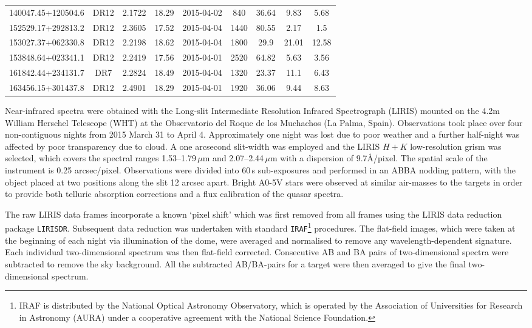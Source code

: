 \begin{table}
\begin{minipage}{16cm}
\begin{tabular}{ccccccccc}
	140047.45+120504.6 & DR12 & 2.1722 & 18.29 & 2015-04-02 & 840 & 36.64 & 9.83 & 5.68 \\
	152529.17+292813.2 & DR12 & 2.3605 & 17.52 & 2015-04-04 & 1440 & 80.55 & 2.17 & 1.5 \\
	153027.37+062330.8 & DR12 & 2.2198 & 18.62 & 2015-04-04 & 1800 & 29.9 & 21.01 & 12.58 \\
	153848.64+023341.1 & DR12 & 2.2419 & 17.56 & 2015-04-01 & 2520 & 64.82 & 5.63 & 3.56 \\
	161842.44+234131.7 & DR7 & 2.2824 & 18.49 & 2015-04-04 & 1320 & 23.37 & 11.1 & 6.43 \\
	163456.15+301437.8 & DR12 & 2.4901 & 18.29 & 2015-04-01 & 1920 & 36.06 & 9.44 & 8.63 \\
    \hline
    \end{tabular}
  \end{minipage}
\end{table}

Near-infrared spectra were obtained with the Long-slit Intermediate Resolution Infrared Spectrograph (LIRIS) mounted on the 4.2m William Herschel Telescope (WHT) at the Observatorio del Roque de los Muchachos (La Palma, Spain). 
Observations took place over four non-contiguous nights from 2015 March 31 to April 4. 
Approximately one night was lost due to poor weather and a further half-night was affected by poor transparency due to cloud. 
A one arcsecond slit-width was employed and the LIRIS $H+K$ low-resolution grism was selected, which covers the spectral ranges 1.53--1.79\,$\mu$m and 2.07--2.44\,$\mu$m with a dispersion of 9.7\AA/pixel. 
The spatial scale of the instrument is 0.25 arcsec/pixel. 
Observations were divided into 60\,s sub-exposures and performed in an ABBA nodding pattern, with the object placed at two positions along the slit 12 arcsec apart. 
Bright A0-5V stars were observed at similar air-masses to the targets in order to provide both telluric absorption corrections and a flux calibration of the quasar spectra.

The raw LIRIS data frames incorporate a known `pixel shift' which was first removed from all frames using the LIRIS data reduction package {\tt LIRISDR}. 
Subsequent data reduction was undertaken with standard {\tt IRAF}\footnote{IRAF is distributed by the National Optical Astronomy Observatory, which is operated by the Association of Universities for Research in Astronomy (AURA) under a cooperative agreement with the National Science Foundation.} procedures.  
The flat-field images, which were taken at the beginning of each night via illumination of the dome, were averaged and normalised to remove any wavelength-dependent signature. 
Each individual two-dimensional spectrum was then flat-field corrected. 
Consecutive AB and BA pairs of two-dimensional spectra were subtracted to remove the sky background. 
All the subtracted AB/BA-pairs for a target were then averaged to give the final two-dimensional spectrum.

